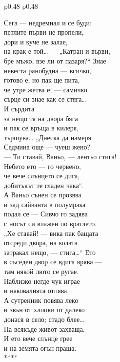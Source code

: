 \documentclass[12pt,a4paper]{article}
\begin{document}
\begin{tabular}{p{0.48\textwidth} p{0.48\textwidth}}
\begin{minipage}[t]{\linewidth}
Сега — недремнал и се буди:\\
петлите първи не пропели,\\
дори и куче не залае,\\
на крак е той… — „Катран и върви,\\
бре мъжо, взе ли от пазаря?“ Знае\\
невеста ранобудна — всичко,\\
готово е, но пак ще пита,\\
че утре жетва е; — самичко\\
сърце си знае как се стяга…\\
И сърдита\\
за нещо тя на двора бяга\\
и пак се връща в килеря,\\
тършува… „Днеска да намеря\\
Седмина още — чуеш жено?\\
— Ти ставай, Ваньо, — лентьо стига!\\
Небето ето — го червено,\\
че вече слънцето се дига,\\
добитъкът те гладен чака“.\\
А Ваньо сънен се прозява\\
и зад сайванта в полумрака\\
подал се — Сивчо го задява\\
с носът си влажен по вратлето.\\
„Хе ставай! — вика пак бащата\\
отсреди двора, на колата\\
затракал нещо, — стига…“ Ето\\
в съседен двор се вдига врява —\\
там някой люто се ругае.\\
Наблизко негде чук играе\\
и наковалнята отпява.\\
А сутренник повява леко\\
и звън от хлопки от далеко\\
донася в село; стадо блее…\\
На всякъде живот захваща.\\
И ето вече слънце грее\\
и на земята огън праща.\\
****
\end{minipage}
\end{tabular}
\end{document}
